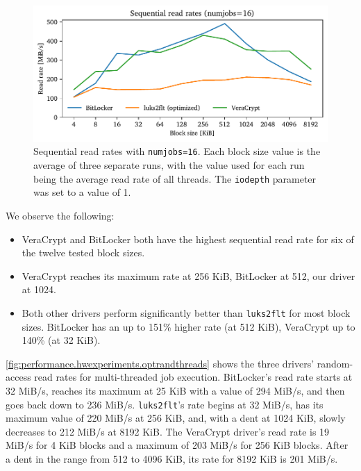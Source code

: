 \begin{figure}[htb!]
	\center
	\includegraphics[scale=1]{../fig/performance.hwexperiments.optseqthreads.pdf}
	\caption[
		Sequential read rates with \texttt{numjobs=16}
	]{
		Sequential read rates with \texttt{numjobs=16}. Each block size value is the average of three separate runs, with the value used for each run being the average read rate of all threads. The \texttt{iodepth} parameter was set to a value of 1.
	}
	\label{fig:performance.hwexperiments.optseqthreads}
\end{figure}

We observe the following:
\begin{itemize}
	\item VeraCrypt and BitLocker both have the highest sequential read rate for six of the twelve tested block sizes.
	\item VeraCrypt reaches its maximum rate at 256 KiB, BitLocker at 512, our driver at 1024.
	\item Both other drivers perform significantly better than \texttt{luks2flt} for most block sizes. BitLocker has an up to 151\% higher rate (at 512 KiB), VeraCrypt up to 140\% (at 32 KiB).
\end{itemize}

\autoref{fig:performance.hwexperiments.optrandthreads} shows the three drivers' random-access read rates for multi-threaded job execution. BitLocker's read rate starts at 32 MiB/s, reaches its maximum at 25 KiB with a value of 294 MiB/s, and then goes back down to 236 MiB/s. \texttt{luks2flt}'s rate begins at 32 MiB/s, has its maximum value of 220 MiB/s at 256 KiB, and, with a dent at 1024 KiB, slowly decreases to 212 MiB/s at 8192 KiB. The VeraCrypt driver's read rate is 19 MiB/s for 4 KiB blocks and a maximum of 203 MiB/s for 256 KiB blocks. After a dent in the range from 512 to 4096 KiB, its rate for 8192 KiB is 201 MiB/s.

